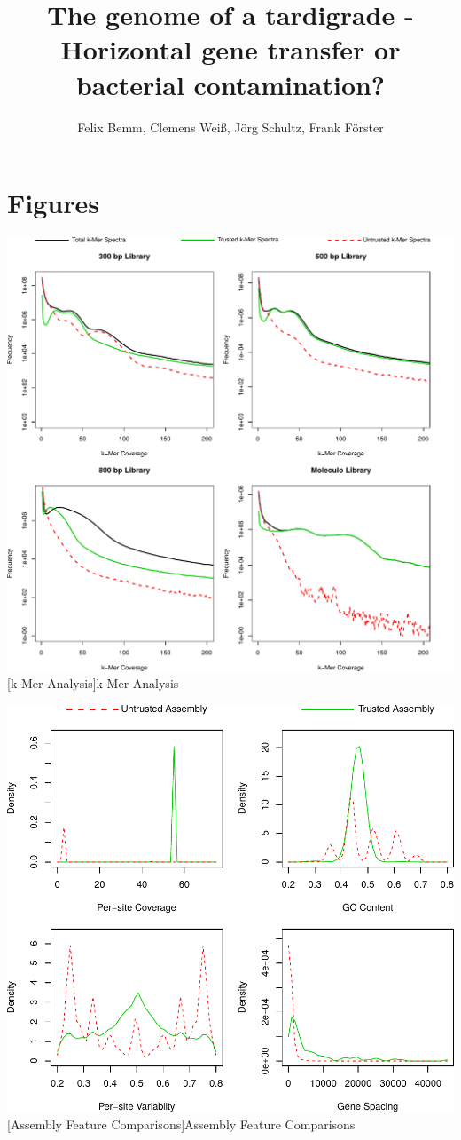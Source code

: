\documentclass[12pt,a4paper]{scrartcl}
\title{\Large The genome of a tardigrade - \\\large Horizontal gene transfer or bacterial contamination?}
\author{\normalsize Felix Bemm, Clemens Weiß, Jörg Schultz, Frank Förster}
\date{}
\begin{document}
\maketitle

\pagebreak

\section{Figures}

\includegraphics[width=1\textwidth]{supplementary_figure_1}
[k-Mer Analysis]{k-Mer Analysis}

\pagebreak

\includegraphics[width=1\textwidth]{supplementary_figure_2}
[Assembly Feature Comparisons]{Assembly Feature Comparisons}
\end{document}
